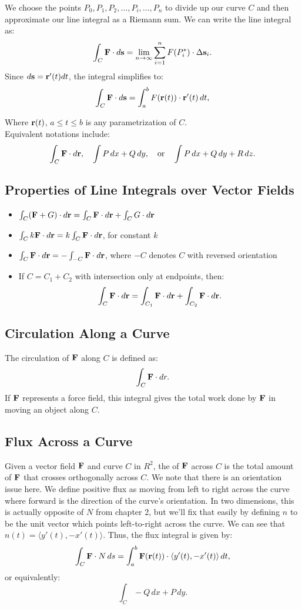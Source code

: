 We choose the points \(P_{0}, P_{1}, P_{2}, \ldots, P_{i},\ldots, P_{n}\) to divide up our curve \(C\) and then approximate our line integral as a Riemann sum. We can write the line integral as:
\[ \int_C \mathbf{F} \cdot d\mathbf{s} = \lim_{n\to\infty} \sum_{i=1}^{n} F(P^*_i) \cdot \Delta \mathbf{s}_i. \]
Since \( d\mathbf{s} = \mathbf{r}'(t) dt \), the integral simplifies to:
\[ \int_C \mathbf{F} \cdot d\mathbf{s} = \int_a^b F(\mathbf{r}(t)) \cdot \mathbf{r}'(t) \, dt, \]

Where \( \mathbf{r}(t) \), \(a \leq t \leq b\) is any parametrization of \(C\). \\ 

Equivalent notations include:
\[ \int_C \mathbf{F} \cdot d\mathbf{r}, \quad \int P \, dx + Q \, dy, \quad \text{or} \quad \int P \, dx + Q \, dy + R \, dz. \]

\subsection{Properties of Line Integrals over Vector Fields}
\begin{itemize}
    \item \( \int_C (\mathbf{F} + G) \cdot d\mathbf{r} = \int_C \mathbf{F} \cdot d\mathbf{r} + \int_C G \cdot d\mathbf{r} \)
    \item \( \int_C k\mathbf{F} \cdot d\mathbf{r} = k \int_C \mathbf{F} \cdot d\mathbf{r} \), for constant \( k \)
    \item \( \int_C \mathbf{F} \cdot d\mathbf{r} = - \int_{-C} \mathbf{F} \cdot d\mathbf{r} \), where \( -C \) denotes \( C \) with reversed orientation
    \item If \( C = C_1 + C_2 \) with intersection only at endpoints, then:
    \[ \int_C \mathbf{F} \cdot d\mathbf{r} = \int_{C_1} \mathbf{F} \cdot d\mathbf{r} + \int_{C_2} \mathbf{F} \cdot d\mathbf{r}. \]
\end{itemize}

\subsection{Circulation Along a Curve}
The circulation of \( \mathbf{F} \) along \( C \) is defined as:
\[ \int_C \mathbf{F} \cdot dr. \]
If \( \mathbf{F} \) represents a force field, this integral gives the total work done by \( \mathbf{F} \) in moving an object along \( C \).

\subsection{Flux Across a Curve}
Given a vector field \(\mathbf{F}\) and curve \(C\) in \(R^{2}\), the  of \(\mathbf{F}\) across \(C\) is the total amount of \(\mathbf{F}\) that crosses orthogonally across \(C\). We note that there is an orientation issue here. We define positive flux as moving from left to right across the curve where forward is the direction of the curve’s orientation. In two dimensions, this is actually opposite of \(N\) from chapter 2, but we’ll fix that easily by defining \(n\) to be the unit vector which points left-to-right across the curve. We can see that \(n(t) = \langle y'(t), -x'(t) \rangle\).
Thus, the flux integral is given by:
\[ \int_C \mathbf{F} \cdot N \, ds = \int_a^b \mathbf{F}(\mathbf{r}(t)) \cdot \langle y'(t), -x'(t) \rangle \, dt, \]
or equivalently:
\[ \int_C -Q \, dx + P \, dy. \]

